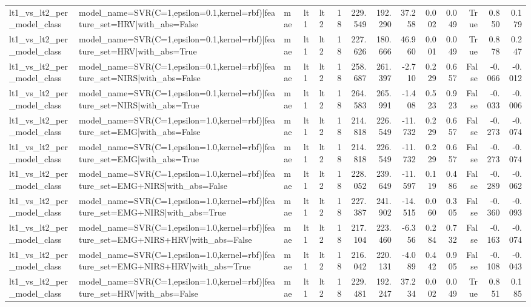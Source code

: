 \begin{table}
\begin{tabular}{lllllrrrrrrrrr}
lt1_vs_lt2_per_model_class & model_name=SVR(C=1,epsilon=0.1,kernel=rbf)|feature_set=HRV|with_abs=False & mae & lt1 & lt2 & 18 & 229.549 & 192.290 & 37.258 & 0.002 & 0.049 & True & 0.850 & 0.179 \\
lt1_vs_lt2_per_model_class & model_name=SVR(C=1,epsilon=0.1,kernel=rbf)|feature_set=HRV|with_abs=True & mae & lt1 & lt2 & 18 & 227.626 & 180.666 & 46.960 & 0.001 & 0.049 & True & 0.878 & 0.247 \\
lt1_vs_lt2_per_model_class & model_name=SVR(C=1,epsilon=0.1,kernel=rbf)|feature_set=NIRS|with_abs=False & mae & lt1 & lt2 & 18 & 258.687 & 261.397 & -2.710 & 0.229 & 0.657 & False & -0.066 & -0.012 \\
lt1_vs_lt2_per_model_class & model_name=SVR(C=1,epsilon=0.1,kernel=rbf)|feature_set=NIRS|with_abs=True & mae & lt1 & lt2 & 18 & 264.583 & 265.991 & -1.408 & 0.523 & 0.923 & False & -0.033 & -0.006 \\
lt1_vs_lt2_per_model_class & model_name=SVR(C=1,epsilon=1.0,kernel=rbf)|feature_set=EMG|with_abs=False & mae & lt1 & lt2 & 18 & 214.818 & 226.549 & -11.732 & 0.229 & 0.657 & False & -0.273 & -0.074 \\
lt1_vs_lt2_per_model_class & model_name=SVR(C=1,epsilon=1.0,kernel=rbf)|feature_set=EMG|with_abs=True & mae & lt1 & lt2 & 18 & 214.818 & 226.549 & -11.732 & 0.229 & 0.657 & False & -0.273 & -0.074 \\
lt1_vs_lt2_per_model_class & model_name=SVR(C=1,epsilon=1.0,kernel=rbf)|feature_set=EMG+NIRS|with_abs=False & mae & lt1 & lt2 & 18 & 228.052 & 239.649 & -11.597 & 0.119 & 0.486 & False & -0.289 & -0.062 \\
lt1_vs_lt2_per_model_class & model_name=SVR(C=1,epsilon=1.0,kernel=rbf)|feature_set=EMG+NIRS|with_abs=True & mae & lt1 & lt2 & 18 & 227.387 & 241.902 & -14.515 & 0.060 & 0.305 & False & -0.360 & -0.093 \\
lt1_vs_lt2_per_model_class & model_name=SVR(C=1,epsilon=1.0,kernel=rbf)|feature_set=EMG+NIRS+HRV|with_abs=False & mae & lt1 & lt2 & 18 & 217.104 & 223.460 & -6.356 & 0.284 & 0.732 & False & -0.163 & -0.074 \\
lt1_vs_lt2_per_model_class & model_name=SVR(C=1,epsilon=1.0,kernel=rbf)|feature_set=EMG+NIRS+HRV|with_abs=True & mae & lt1 & lt2 & 18 & 216.042 & 220.131 & -4.089 & 0.442 & 0.905 & False & -0.108 & -0.043 \\
lt1_vs_lt2_per_model_class & model_name=SVR(C=1,epsilon=1.0,kernel=rbf)|feature_set=HRV|with_abs=False & mae & lt1 & lt2 & 18 & 229.481 & 192.247 & 37.234 & 0.002 & 0.049 & True & 0.851 & 0.185 \\

\end{tabular}
\end{table}
